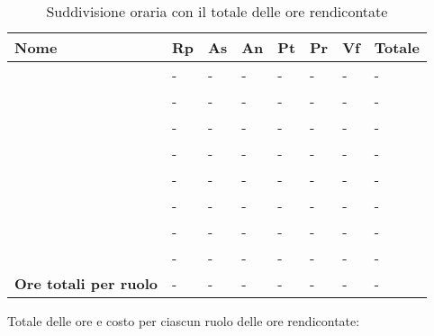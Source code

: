 			\begin{longtable}{ 
				>{\centering}p{} 
				>{\centering}p{}
				>{\centering}p{} 
				>{\centering}p{} 
				>{\centering}p{}
				>{\centering}p{} 
				>{\centering}p{}
				>{\centering\arraybackslash}p{} }
	
				\caption {Suddivisione oraria con il totale delle ore rendicontate} \\
			
				\textbf{\color{white}Nome} & 
				\textbf{\color{white}Rp} & 
				\textbf{\color{white}As} & 
				\textbf{\color{white}An} &
				\textbf{\color{white}Pt} &
				\textbf{\color{white}Pr} &
				\textbf{\color{white}Vf} &
				\textbf{\color{white}Totale}
				\tabularnewline  
				\endhead
			
				\VB & - & - & - & - & - & - & - \\
				\LB & - & - & - & - & - & - & - \\
				\NF & - & - & - & - & - & - & - \\
				\EG & - & - & - & - & - & - & - \\
				\FJ & - & - & - & - & - & - & - \\
				\MP & - & - & - & - & - & - & - \\
				\AS & - & - & - & - & - & - & - \\
				\AZ & - & - & - & - & - & - & - \\
				\textbf{Ore totali per ruolo} & - & - & - & - & - & - & - \\
			\end{longtable}
			
			
			Totale delle ore e costo per ciascun ruolo delle ore rendicontate:
		
